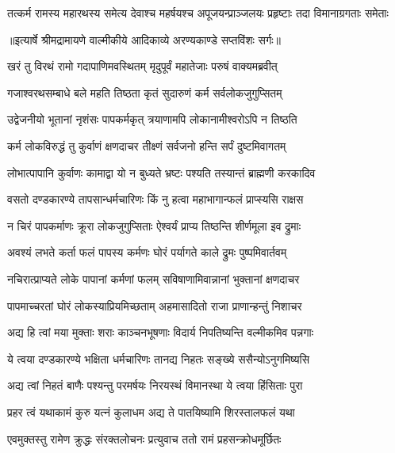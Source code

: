 \fourlineindentedshloka
{तत्कर्म रामस्य महारथस्य}
{समेत्य देवाश्च महर्षयश्च}
{अपूजयन्प्राञ्जलयः प्रहृष्टाः}
{तदा विमानाग्रगताः समेताः} %


{॥इत्यार्षे श्रीमद्रामायणे वाल्मीकीये आदिकाव्ये अरण्यकाण्डे सप्तविंशः सर्गः॥}


\twolineshloka
{खरं तु विरथं रामो गदापाणिमवस्थितम्}
{मृदुपूर्वं महातेजाः परुषं वाक्यमब्रवीत्} %

\twolineshloka
{गजाश्वरथसम्बाधे बले महति तिष्ठता}
{कृतं सुदारुणं कर्म सर्वलोकजुगुप्सितम्} %

\twolineshloka
{उद्वेजनीयो भूतानां नृशंसः पापकर्मकृत्}
{त्रयाणामपि लोकानामीश्वरोऽपि न तिष्ठति} %

\twolineshloka
{कर्म लोकविरुद्धं तु कुर्वाणं क्षणदाचर}
{तीक्ष्णं सर्वजनो हन्ति सर्पं दुष्टमिवागतम्} %

\twolineshloka
{लोभात्पापानि कुर्वाणः कामाद्वा यो न बुध्यते}
{भ्रष्टः पश्यति तस्यान्तं ब्राह्मणी करकादिव} %

\twolineshloka
{वसतो दण्डकारण्ये तापसान्धर्मचारिणः}
{किं नु हत्वा महाभागान्फलं प्राप्स्यसि राक्षस} %

\twolineshloka
{न चिरं पापकर्माणः क्रूरा लोकजुगुप्सिताः}
{ऐश्वर्यं प्राप्य तिष्ठन्ति शीर्णमूला इव द्रुमाः} %

\twolineshloka
{अवश्यं लभते कर्ता फलं पापस्य कर्मणः}
{घोरं पर्यागते काले द्रुमः पुष्पमिवार्तवम्} %

\twolineshloka
{नचिरात्प्राप्यते लोके पापानां कर्मणां फलम्}
{सविषाणामिवान्नानां भुक्तानां क्षणदाचर} %

\twolineshloka
{पापमाच्चरतां घोरं लोकस्याप्रियमिच्छताम्}
{अहमासादितो राजा प्राणान्हन्तुं निशाचर} %

\twolineshloka
{अद्य हि त्वां मया मुक्ताः शराः काञ्चनभूषणाः}
{विदार्य निपतिष्यन्ति वल्मीकमिव पन्नगाः} %

\twolineshloka
{ये त्वया दण्डकारण्ये भक्षिता धर्मचारिणः}
{तानद्य निहतः सङ्ख्ये ससैन्योऽनुगमिष्यसि} %

\twolineshloka
{अद्य त्वां निहतं बाणैः पश्यन्तु परमर्षयः}
{निरयस्थं विमानस्था ये त्वया हिंसिताः पुरा} %

\twolineshloka
{प्रहर त्वं यथाकामं कुरु यत्नं कुलाधम}
{अद्य ते पातयिष्यामि शिरस्तालफलं यथा} %

\twolineshloka
{एवमुक्तस्तु रामेण क्रुद्धः संरक्तलोचनः}
{प्रत्युवाच ततो रामं प्रहसन्क्रोधमूर्छितः} %

